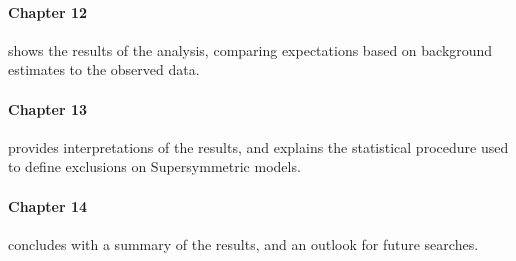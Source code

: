 \paragraph{Chapter 12} shows the results of the analysis, comparing expectations based on background estimates to the observed data. 

\paragraph{Chapter 13} provides interpretations of the results, and explains the statistical procedure used to define exclusions on Supersymmetric models. 

\paragraph{Chapter 14} concludes with a summary of the results, and an outlook for future searches. 
